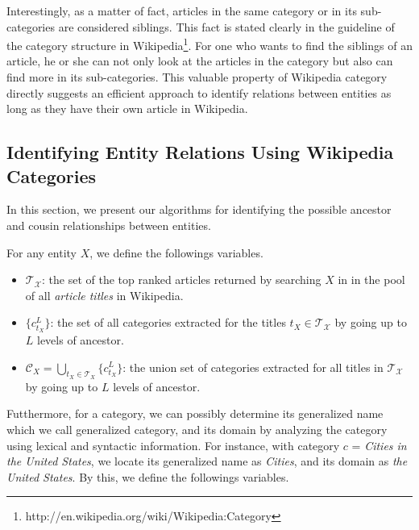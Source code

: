 Interestingly, as a matter of fact, articles in the same category or in its sub-categories are considered siblings. This fact is stated clearly in the guideline of the category structure in Wikipedia\footnote{http://en.wikipedia.org/wiki/Wikipedia:Category}. For one who wants to find the siblings of an article, he or she can not only look at the articles in the category but also can find more in its sub-categories. This valuable property of Wikipedia category directly suggests an efficient approach to identify relations between entities as long as they have their own article in Wikipedia.

\subsection{Identifying Entity Relations Using Wikipedia Categories}
\label{sec:algorithms}

In this section, we present our algorithms for identifying the possible ancestor and cousin relationships between entities.

For any entity $X$, we define the followings variables.

\begin{itemize}
\item $\mathcal{T_{X}}$: the set of the top ranked articles returned by searching $X$ in in the pool of all {\em article titles} in Wikipedia.
\item $\{ c_{t_{X}}^{L} \}$: the set of all categories extracted for the titles $t_{X} \in \mathcal{T_{X}}$ by going up to $L$ levels of ancestor.
\item ${\mathcal C}_{X} = \bigcup_{t_{X} \in {\mathcal T}_{X}} \{{c_{t_{X}}^{L}\}}$: the union set of categories extracted for all titles in $\mathcal{T_{X}}$ by going up to $L$ levels of ancestor.
\end{itemize}

Futthermore, for a category, we can possibly determine its generalized name which we call generalized category, and its domain by analyzing the category using lexical and syntactic information. For instance, with category $c$ = {\em Cities in the United States}, we locate its generalized name as {\em Cities}, and its domain as {\em the United States}. By this, we define the followings variables.

